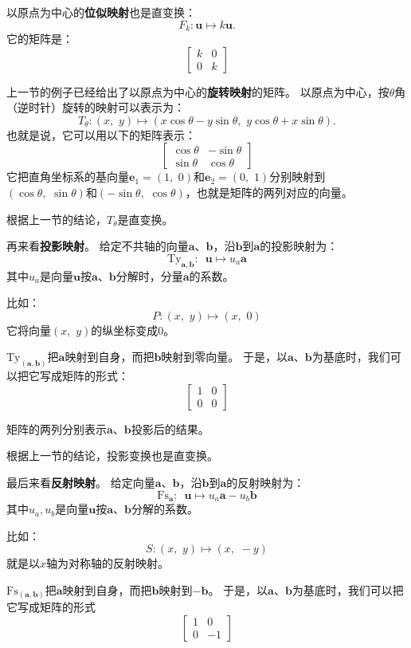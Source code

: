 \documentclass[12pt,UTF8]{ctexbook}
\begin{document}
以原点为中心的\textbf{位似映射}也是直变换：
$$ F_k : \mathbf{u} \mapsto k\mathbf{u}.$$
它的矩阵是：
$$
\begin{bmatrix}
    k & 0 \\ 0 & k
\end{bmatrix}
$$

上一节的例子已经给出了以原点为中心的\textbf{旋转映射}的矩阵。
以原点为中心，按$\theta$角（逆时针）旋转的映射可以表示为：
$$T_{\theta}: (x,\,\, y) \mapsto (x\cos{\theta} - y\sin{\theta},\,\,y\cos{\theta} + x\sin{\theta}).$$
也就是说，它可以用以下的矩阵表示：
$$
\begin{bmatrix}
    \cos{\theta} & -\sin{\theta} \\ \sin{\theta} & \cos{\theta}
\end{bmatrix}
$$
它把直角坐标系的基向量$\mathbf{e}_1 = (1,\,\,0)$和$\mathbf{e}_2 = (0,\,\,1)$分别映射到
$(\cos{\theta},\,\,\sin{\theta})$和$(-\sin{\theta},\,\,\cos{\theta})$，也就是矩阵的两列对应的向量。

根据上一节的结论，$T_{\theta}$是直变换。 

再来看\textbf{投影映射}。
给定不共轴的向量$\mathbf{a}$、$\mathbf{b}$，沿$\mathbf{b}$到$\mathbf{a}$的投影映射为：
$$ \mathrm{Ty}_{\mathbf{a}, \mathbf{b}} : \,\,\, \mathbf{u} \mapsto u_a \mathbf{a} $$
其中$u_a$是向量$\mathbf{u}$按$\mathbf{a}$、$\mathbf{b}$分解时，分量$\mathbf{a}$的系数。

比如：
$$ P: (x,\,\, y) \mapsto (x,\,\,0)$$
它将向量$(x,\,\, y)$的纵坐标变成$0$。

$\mathrm{Ty}_{(\mathbf{a},\mathbf{b})}$把$\mathbf{a}$映射到自身，而把$\mathbf{b}$映射到零向量。
于是，以$\mathbf{a}$、$\mathbf{b}$为基底时，我们可以把它写成矩阵的形式：
$$
\begin{bmatrix}
    1 & 0 \\ 0 & 0
\end{bmatrix}
$$

矩阵的两列分别表示$\mathbf{a}$、$\mathbf{b}$投影后的结果。

根据上一节的结论，投影变换也是直变换。

最后来看\textbf{反射映射}。
给定向量$\mathbf{a}$、$\mathbf{b}$，沿$\mathbf{b}$到$\mathbf{a}$的反射映射为：
$$ \mathrm{Fs}_{\mathbf{a}} : \,\,\, \mathbf{u} \mapsto u_a \mathbf{a} - u_b \mathbf{b} $$
其中$u_a, u_b$是向量$\mathbf{u}$按$\mathbf{a}$、$\mathbf{b}$分解的系数。

比如：
$$ S: (x,\,\,y) \mapsto (x,\,\, -y) $$
就是以$x$轴为对称轴的反射映射。

$\mathrm{Fs}_{(\mathbf{a},\mathbf{b})}$把$\mathbf{a}$映射到自身，而把$\mathbf{b}$映射到$-\mathbf{b}$。
于是，以$\mathbf{a}$、$\mathbf{b}$为基底时，我们可以把它写成矩阵的形式
$$
\begin{bmatrix}
    1 & 0 \\ 0 & -1
\end{bmatrix}
$$
\end{document}
